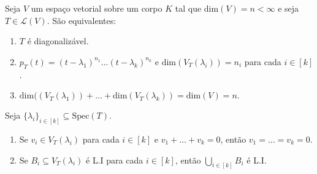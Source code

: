 \documentclass[11pt,twoside,a4paper]{book}
\begin{document}
\begin{teorema}
Seja \(V\) um espaço vetorial sobre um corpo \(K\) tal que \(\text{dim}(V)=n<\infty\) e seja \(T\in\mathcal{L}(V)\). São equivalentes:
\begin{enumerate}
    \item \(T\) é diagonalizável.
    \item \(p_T(t)=(t-\lambda_1)^{n_1}\ldots(t-\lambda_k)^{n_k}\) e \(\text{dim}(V_T(\lambda_i))=n_i\) para cada \(i\in [k]\).
    \item\(\text{dim}((V_T(\lambda_1))+\ldots+\text{dim}(V_T(\lambda_k))=\text{dim}(V)=n.\)
\end{enumerate}
\end{teorema}
\begin{lema}
Seja \(\{\lambda_i\}_{i\in [k]}\subseteq\text{Spec}(T).\)
\begin{enumerate}
    \item Se \(v_i \in V_T(\lambda_i)\) para cada \(i\in [k]\) e \(v_1+\ldots+v_k=0\), então \(v_1=\ldots=v_k=0\).
    \item Se \(B_i\subseteq V_T(\lambda_i)\) é L.I para cada \(i\in [k]\), então \(\bigcup_{i\in [k]}B_i\) é L.I.
\end{enumerate}
\end{lema}
\end{document}
